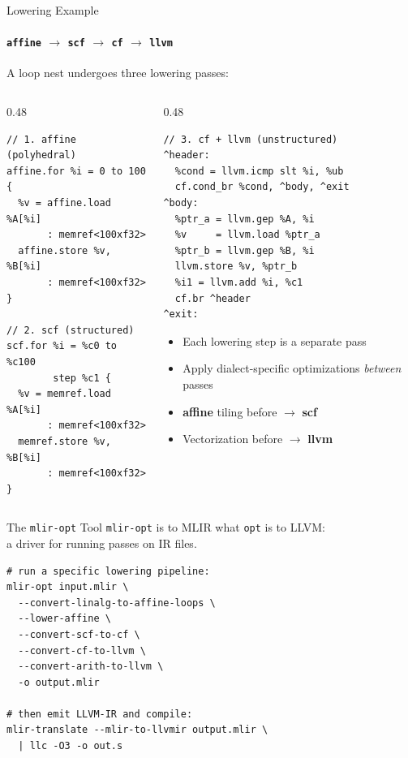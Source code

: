 \begin{frame}[fragile]{Lowering Example}
  \framesubtitle{\texttt{affine} $\to$ \texttt{scf} $\to$ \texttt{cf} $\to$ \texttt{llvm}}
  A loop nest undergoes three lowering passes:

  \begin{columns}
    \begin{column}{0.48\textwidth}
\begin{lstlisting}[language=none,basicstyle=\ttfamily\scriptsize]
// 1. affine (polyhedral)
affine.for %i = 0 to 100 {
  %v = affine.load %A[%i]
       : memref<100xf32>
  affine.store %v, %B[%i]
       : memref<100xf32>
}

// 2. scf (structured)
scf.for %i = %c0 to %c100
        step %c1 {
  %v = memref.load %A[%i]
       : memref<100xf32>
  memref.store %v, %B[%i]
       : memref<100xf32>
}
\end{lstlisting}
    \end{column}
    \begin{column}{0.48\textwidth}
\begin{lstlisting}[language=none,basicstyle=\ttfamily\scriptsize]
// 3. cf + llvm (unstructured)
^header:
  %cond = llvm.icmp slt %i, %ub
  cf.cond_br %cond, ^body, ^exit
^body:
  %ptr_a = llvm.gep %A, %i
  %v     = llvm.load %ptr_a
  %ptr_b = llvm.gep %B, %i
  llvm.store %v, %ptr_b
  %i1 = llvm.add %i, %c1
  cf.br ^header
^exit:
\end{lstlisting}
      \begin{itemize}\small
        \item Each lowering step is a separate pass
        \item Apply dialect-specific optimizations \emph{between} passes
        \item \textcolor{mainAccent}{\textbf{affine} tiling before $\to$ \textbf{scf}}
        \item \textcolor{mainAccent}{Vectorization before $\to$ \textbf{llvm}}
      \end{itemize}
    \end{column}
  \end{columns}
\end{frame}


\begin{frame}[fragile,shrink=5]{The \texttt{mlir-opt} Tool}
  \bigskip
  \texttt{mlir-opt} is to MLIR what \texttt{opt} is to LLVM:\\
  a driver for running passes on IR files.

  \bigskip
\begin{lstlisting}[language=none,basicstyle=\ttfamily\small]
# run a specific lowering pipeline:
mlir-opt input.mlir \
  --convert-linalg-to-affine-loops \
  --lower-affine \
  --convert-scf-to-cf \
  --convert-cf-to-llvm \
  --convert-arith-to-llvm \
  -o output.mlir

# then emit LLVM-IR and compile:
mlir-translate --mlir-to-llvmir output.mlir \
  | llc -O3 -o out.s
\end{lstlisting}

\end{frame}


